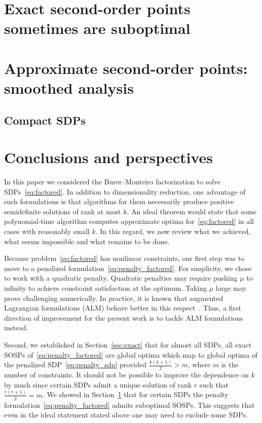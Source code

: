 \documentclass{article}
\begin{document}
\section{Exact second-order points sometimes are suboptimal}
\label{sec:exact_sub}


\section{Approximate second-order points: smoothed analysis}
\label{sec:smooth}


\subsection{Compact SDPs} \label{sec:compact}









\section{Conclusions and perspectives}\label{sec:conc}

In this paper we considered the Burer--Monteiro factorization to solve SDPs~\eqref{eq:factored}. In addition to dimensionality reduction, one advantage of such formulations is that algorithms for them necessarily produce positive semidefinite solutions of rank at most $k$. An ideal theorem would state that some polynomial-time algorithm computes approximate optima for~\eqref{eq:factored} in all cases with reasonably small $k$. In this regard, we now review what we achieved, what seems impossible and what remains to be done.

Because problem~\eqref{eq:factored} has nonlinear constraints, our first step was to move to a penalized formulation~\eqref{eq:penalty_factored}. For simplicity, we chose to work with a quadratic penalty. Quadratic penalties may require pushing $\mu$ to infinity to achieve constraint satisfaction at the optimum. Taking $\mu$ large may prove challenging numerically. In practice, it is known that augmented Lagrangian formulations (ALM) behave better in this respect~\citep{birgin2014ALM}. Thus, a first direction of improvement for the present work is to tackle ALM formulations instead.

Second, we established in Section~\ref{sec:exact} that for almost all SDPs, all exact SOSPs of~\eqref{eq:penalty_factored} are global optima which map to global optima of the penalized SDP~\eqref{eq:penalty_sdp} provided $\frac{k(k+1)}{2} > m$, where $m$ is the number of constraints. It should not be possible to improve the dependence on $k$ by much since certain SDPs admit a unique solution of rank $r$ such that $\frac{r(r+1)}{2} = m$. We showed in Section~\ref{sec:exact_sub} that for certain SDPs the penalty formulation~\eqref{eq:penalty_factored} admits suboptimal SOSPs. This suggests that even in the ideal statement stated above one may need to exclude some SDPs.
\end{document}
